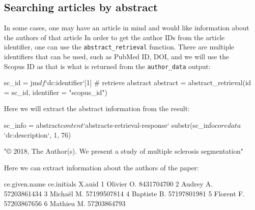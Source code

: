 \hypertarget{searching-articles-by-abstract}{%
\subsection{Searching articles by
abstract}\label{searching-articles-by-abstract}}

In some cases, one may have an article in mind and would like
information about the authors of that article In order to get the author
IDs from the article identifier, one can use the
\texttt{abstract\_retrieval} function. There are multiple identifiers
that can be used, such as PubMed ID, DOI, and we will use the Scopus ID
as that is what is returned from the \texttt{author\_data} output:

\begin{Schunk}
\begin{Sinput}
sc_id = jm$df$`dc:identifier`[1]
# retrieve abstract 
abstract = abstract_retrieval(id = sc_id, identifier = "scopus_id")
\end{Sinput}
\end{Schunk}

Here we will extract the abstract information from the result:

\begin{Schunk}
\begin{Sinput}
sc_info = abstract$content$`abstracts-retrieval-response`
substr(sc_info$coredata$`dc:description`, 1, 76)
\end{Sinput}
\begin{Soutput}
[1] "© 2018, The Author(s). We present a study of multiple sclerosis segmentation"
\end{Soutput}
\end{Schunk}

Here we can extract information about the authors of the paper:

\begin{Schunk}
\begin{Soutput}
  ce.given.name ce.initials      X.auid
1       Olivier          O.  8431704700
2        Audrey          A. 57203861434
3       Michaël          M. 57199507814
4      Baptiste          B. 57197801981
5       Florent          F. 57203867656
6       Mathieu          M. 57203864793
\end{Soutput}
\end{Schunk}

